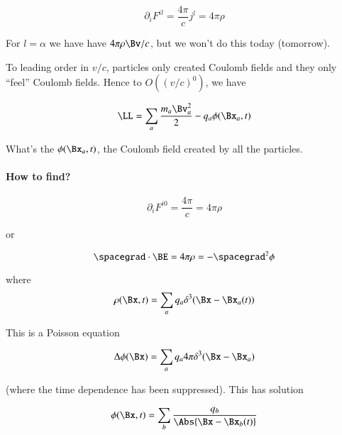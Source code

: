 \begin{equation}\label{eqn:relativisticElectrodynamicsL24:130}
\partial_i F^{i l} = \frac{4 \pi}{c} j^l = 4 \pi \rho
\end{equation}

For $l = \alpha$ we have have $4 \pi \rho \Bv/c$, but we won't do this today (tomorrow).

To leading order in $v/c$, particles only created Coulomb fields and they only ``feel'' Coulomb fields.  Hence to $O((v/c)^0)$, we have 

\begin{equation}\label{eqn:relativisticElectrodynamicsL24:150}
\LL = \sum_a \frac{m_a \Bv_a^2}{2} - q_a \phi(\Bx_a, t)
\end{equation}

What's the $\phi(\Bx_a, t)$, the Coulomb field created by all the particles.

\paragraph{How to find?}

\begin{equation}\label{eqn:relativisticElectrodynamicsL24:170}
\partial_i F^{i 0} = \frac{4 \pi}{c} = 4 \pi \rho
\end{equation}

or

\begin{equation}\label{eqn:relativisticElectrodynamicsL24:190}
\spacegrad \cdot \BE = 4 \pi \rho = - \spacegrad^2 \phi 
\end{equation}

where
\begin{equation}\label{eqn:relativisticElectrodynamicsL24:210}
\rho(\Bx, t) = \sum_a q_a \delta^3 (\Bx - \Bx_a(t))
\end{equation}

This is a Poisson equation

\begin{equation}\label{eqn:relativisticElectrodynamicsL24:230}
\Delta \phi(\Bx) = \sum_a q_a 4 \pi \delta^3(\Bx - \Bx_a)
\end{equation}

(where the time dependence has been suppressed).  This has solution 

\begin{equation}\label{eqn:relativisticElectrodynamicsL24:10}
\phi(\Bx, t) = \sum_b \frac{q_b}{\Abs{\Bx - \Bx_b(t)}}
\end{equation}

